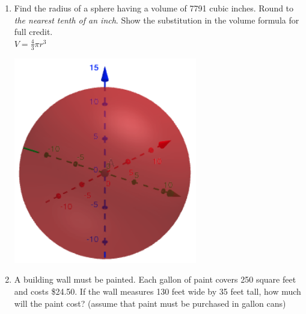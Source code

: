 \documentclass[12pt, twoside]{article}
\begin{document}
\begin{enumerate}
\newpage
\item Find the radius of a sphere having a volume of 7791 cubic inches. Round to \emph{the nearest tenth of an inch}. Show the substitution in the volume formula for full credit. \\[0.5cm]
$\displaystyle V = \frac{4}{3} \pi r^3$
  \begin{flushright}
    \includegraphics[width=8cm]{6-15-9-sphere.png}
  \end{flushright}

\newpage
\item A building wall must be painted. Each gallon of paint covers 250 square feet and costs \$24.50. If the wall measures 130 feet wide by 35 feet tall, how much will the paint cost? (assume that paint must be purchased in gallon cans)

\end{enumerate}
\end{document}
